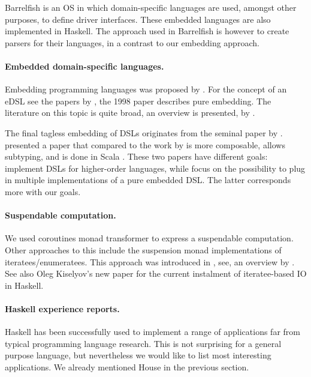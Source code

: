 Barrelfish \cite{barrelfish} is an OS in which domain-specific languages are used, amongst other purposes, to define driver interfaces.
These embedded languages are also implemented in Haskell.
The approach used in Barrelfish is however to create parsers for their languages, in a contrast to our embedding approach.


\paragraph{Embedded domain-specific languages.}
Embedding programming languages was proposed by \citeauthor{Landin:1966:NPL:365230.365257} \cite{Landin:1966:NPL:365230.365257}.
For the concept of an eDSL see the papers by \citeauthor{hudak1} \cite{hudak1,hudak2}, the 1998 paper describes pure embedding.
The literature on this topic is quite broad, an overview is presented, \eg by \citeauthor{dsl-survey} \cite{dsl-survey}.

The final tagless embedding of DSLs originates from the seminal paper by \citeauthor{final_tagless_embedding} \cite{final_tagless_embedding}.
\citeauthor{Hofer:2008:PED:1449913.1449935} \cite{Hofer:2008:PED:1449913.1449935} presented a paper that compared to the work by \citeauthor{final_tagless_embedding} \cite{final_tagless_embedding} is more composable, allows subtyping, and is done in Scala \cite{odersky2008programming}.
These two papers have different goals: \citeauthor{final_tagless_embedding} implement DSLs for higher-order languages, while \citeauthor{Hofer:2008:PED:1449913.1449935} focus on the possibility to plug in multiple implementations of a pure embedded DSL.
The latter corresponds more with our goals.

\paragraph{Suspendable computation.} We used coroutines monad transformer \cite{cmt} to express a suspendable computation. 
Other approaches to this include the suspension monad implementations of iteratees/enumeratees. This approach was introduced in \cite{oleg-iteratee}, see, \eg an overview by \citeauthor{lato2010iteratee} \cite{lato2010iteratee}.
See also Oleg Kiselyov's new paper \cite{springerlink:10.1007/978-3-642-29822-6_15} for the current instalment of iteratee-based IO in Haskell.

\paragraph{Haskell experience reports.}  
Haskell has been successfully used to implement a range of applications far from typical programming language research.
This is not surprising for a general purpose language, but nevertheless we would like to list most interesting applications. 
We already mentioned House \cite{house} in the previous section.

